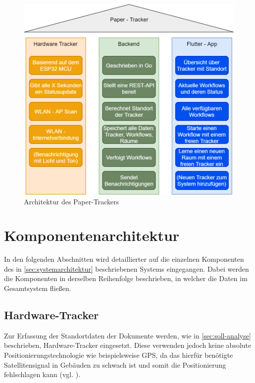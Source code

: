 \begin{figure}[h!tbp]
	\includegraphics[width=\textwidth]{images/architecture_de.png}
	\centering
	\caption{Architektur des Paper-Trackers}
	\label{fig:architecture}
\end{figure}

\section{Komponentenarchitektur} \label{sec:komponentenarchitektur}

In den folgenden Abschnitten wird detaillierter auf die einzelnen Komponenten des in
\autoref{sec:systemarchitektur} beschriebenen Systems eingegangen.
Dabei werden die Komponenten in derselben Reihenfolge beschrieben, in welcher die Daten im
Gesamtsystem fließen.

\subsection{Hardware-Tracker} \label{sec:tracking-hardware}

Zur Erfassung der Standortdaten der Dokumente werden, wie in \autoref{sec:soll-analyse}
beschrieben, Hardware-Tracker eingesetzt.
Diese verwenden jedoch keine absolute Positionierungstechnologie wie beispielsweise \gls{GPS}, da
das hierfür benötigte Satellitensignal in Gebäuden zu schwach ist und somit die Positionierung
fehlschlagen kann (vgl. \cite{Liu}).

